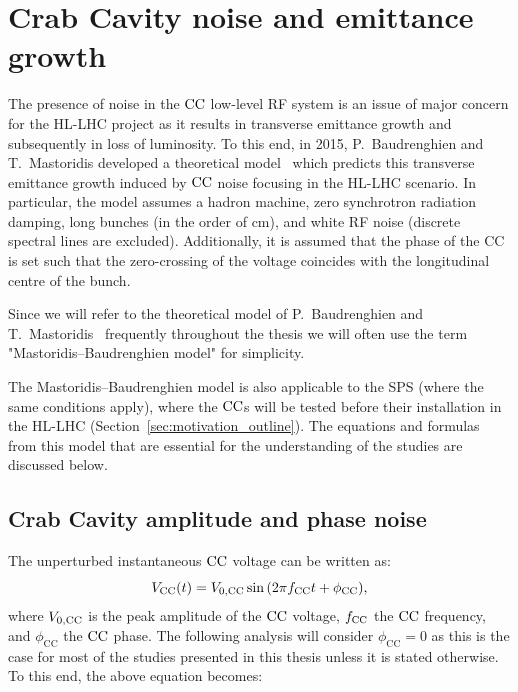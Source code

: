 

\section{Crab Cavity noise and emittance growth}\label{sec:CC_noise_intro}
The presence of noise in the ${\mathrm{CC}}$ low-level RF system is an issue of major concern for the HL-LHC project as it results in transverse emittance growth and subsequently in loss of luminosity. To this end, in 2015, P.~Baudrenghien and T.~Mastoridis developed a theoretical model~\cite{PhysRevSTAB.18.101001} which predicts this transverse emittance growth induced by ${\mathrm{CC}}$ noise focusing in the HL-LHC scenario. In particular, the model assumes a hadron machine, zero synchrotron radiation damping, long bunches (in the order of cm), and white RF noise (discrete spectral lines are excluded). Additionally, it is assumed that the phase of the CC is set such that the zero-crossing of the voltage coincides with the longitudinal centre of the bunch.

Since we will refer to the theoretical model of P.~Baudrenghien and T.~Mastoridis~\cite{PhysRevSTAB.18.101001} frequently throughout the thesis we will often use the term "Mastoridis--Baudrenghien model" for simplicity.

The Mastoridis--Baudrenghien model is also applicable to the SPS (where the same conditions apply), where the ${\mathrm{CC}}$s will be tested before their installation in the HL-LHC (Section~\ref{sec:motivation_outline}). The equations and formulas from this model that are essential for the understanding of the studies are discussed below.




\subsection{Crab Cavity amplitude and phase noise}\label{subsec:AN_PN}
The unperturbed instantaneous ${\mathrm{CC}}$ voltage can be written as:
\begin{equation}\label{eq:CC_voltage_t_phase}
    V_\mathrm{CC}(t) = {V_\mathrm{0, CC}} \sin{\left ( 2 \pi {f_\mathrm{CC}}t + \phi_\mathrm{CC} \right )},
\end{equation}
where ${V_\mathrm{0, CC}}$ is the peak amplitude of the ${\mathrm{CC}}$ voltage, ${f_\mathrm{CC}}$ the ${\mathrm{CC}}$ frequency, and $\phi_\mathrm{CC}$ the ${\mathrm{CC}}$ phase. The following analysis will consider $\phi_\mathrm{CC}=0$ as this is the case for most of the studies presented in this thesis unless it is stated otherwise. To this end, the above equation becomes: 

